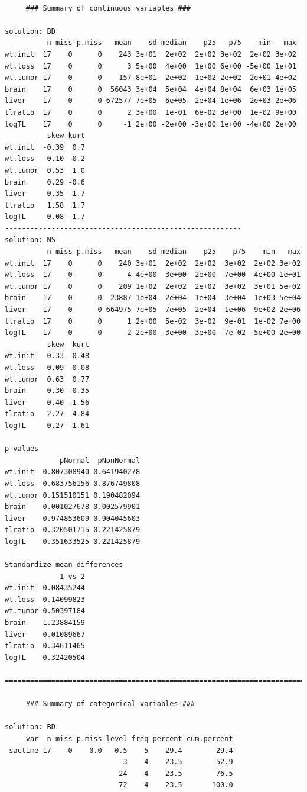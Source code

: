 \documentclass[]{book}
\theoremstyle{definition}
\theoremstyle{definition}
\theoremstyle{definition}
\theoremstyle{remark}
\begin{document}
\begin{verbatim}

     ### Summary of continuous variables ###

solution: BD
          n miss p.miss   mean    sd median    p25   p75    min   max
wt.init  17    0      0    243 3e+01  2e+02  2e+02 3e+02  2e+02 3e+02
wt.loss  17    0      0      3 5e+00  4e+00  1e+00 6e+00 -5e+00 1e+01
wt.tumor 17    0      0    157 8e+01  2e+02  1e+02 2e+02  2e+01 4e+02
brain    17    0      0  56043 3e+04  5e+04  4e+04 8e+04  6e+03 1e+05
liver    17    0      0 672577 7e+05  6e+05  2e+04 1e+06  2e+03 2e+06
tlratio  17    0      0      2 3e+00  1e-01  6e-02 3e+00  1e-02 9e+00
logTL    17    0      0     -1 2e+00 -2e+00 -3e+00 1e+00 -4e+00 2e+00
          skew kurt
wt.init  -0.39  0.7
wt.loss  -0.10  0.2
wt.tumor  0.53  1.0
brain     0.29 -0.6
liver     0.35 -1.7
tlratio   1.58  1.7
logTL     0.08 -1.7
-------------------------------------------------------- 
solution: NS
          n miss p.miss   mean    sd median    p25    p75    min   max
wt.init  17    0      0    240 3e+01  2e+02  2e+02  3e+02  2e+02 3e+02
wt.loss  17    0      0      4 4e+00  3e+00  2e+00  7e+00 -4e+00 1e+01
wt.tumor 17    0      0    209 1e+02  2e+02  2e+02  3e+02  3e+01 5e+02
brain    17    0      0  23887 1e+04  2e+04  1e+04  3e+04  1e+03 5e+04
liver    17    0      0 664975 7e+05  7e+05  2e+04  1e+06  9e+02 2e+06
tlratio  17    0      0      1 2e+00  5e-02  3e-02  9e-01  1e-02 7e+00
logTL    17    0      0     -2 2e+00 -3e+00 -3e+00 -7e-02 -5e+00 2e+00
          skew  kurt
wt.init   0.33 -0.48
wt.loss  -0.09  0.08
wt.tumor  0.63  0.77
brain     0.30 -0.35
liver     0.40 -1.56
tlratio   2.27  4.84
logTL     0.27 -1.61

p-values
             pNormal  pNonNormal
wt.init  0.807308940 0.641940278
wt.loss  0.683756156 0.876749808
wt.tumor 0.151510151 0.190482094
brain    0.001027678 0.002579901
liver    0.974853609 0.904045603
tlratio  0.320501715 0.221425879
logTL    0.351633525 0.221425879

Standardize mean differences
             1 vs 2
wt.init  0.08435244
wt.loss  0.14099823
wt.tumor 0.50397184
brain    1.23884159
liver    0.01089667
tlratio  0.34611465
logTL    0.32420504

=======================================================================================

     ### Summary of categorical variables ### 

solution: BD
     var  n miss p.miss level freq percent cum.percent
 sactime 17    0    0.0   0.5    5    29.4        29.4
                            3    4    23.5        52.9
                           24    4    23.5        76.5
                           72    4    23.5       100.0
                                                      

\end{verbatim}
\end{document}
